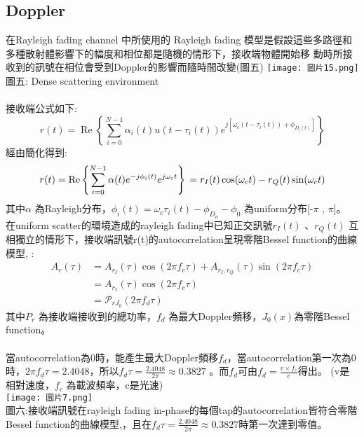 \documentclass[12pt,a4paper]{article} %
\begin{document}
\subsection{Doppler}
在Rayleigh fading channel 中所使用的 Rayleigh fading 模型是假設這些多路徑和
多種散射體影響下的幅度和相位都是隨機的情形下，接收端物體開始移
動時所接收到的訊號在相位會受到Doppler的影響而隨時間改變(圖五)
\texttt{[image: 圖片15.png]}\\
圖五: Dense scattering environment \cite{goldsmith2005wireless}\\
\\
接收端公式如下:
\[r(t)=\operatorname{Re}\left\{ \sum_{i=0}^{N-1} \alpha_i(t) u(t-\tau_i(t)) e^{j[\omega_c(t-\tau_i(t))+\phi_{D_i(t)}]}\right\}\]
經由簡化得到:
\[r(t) = \operatorname{Re}\left\{ \sum_{i=0}^{N-1} \alpha(t) e^{-j\phi_i(t)} e^{j\omega_c t} \right\} \\
= r_I(t) \cos(\omega_c t) - r_Q(t) \sin(\omega_c t)\]
其中$\alpha$ 為Rayleigh分布，$\phi_i(t) = \omega_c \tau_i(t) - \phi_{D_n} - \phi_0$ 為uniform分布[-$\pi$ , $\pi$]。
\\
在uniform scatter的環境造成的rayleigh fading中已知正交訊號$r_I(t)$
、$r_Q(t)$ 互相獨立的情形下，接收端訊號r(t)的autocorrelation呈現零階Bessel function的曲線模型\cite{goldsmith2005wireless},\cite{zheng2002improved} : 
\begin{align*}
A_r(\tau) &= A_{r_I}(\tau) \cos(2\pi f_c \tau) + A_{r_I,r_Q}(\tau) \sin(2\pi f_c \tau) \\
&= A_{r_I}(\tau) \cos(2\pi f_c \tau) \\
&= \mathcal{P}_{rJ_0}(2\pi f_d \tau)
\end{align*}
其中$P_{r}$ 為接收端接收到的總功率，$f_{d}$ 為最大Doppler頻移，$J_{0}(x)$為零階Bessel function。\\
\\
當autocorrelation為0時，能產生最大Doppler頻移$f_{d}$，當autocorrelation第一次為0時，$2\pi f_d \tau = 2.4048$，所以$f_d \tau = \frac{2.4048}{2\pi} \approx 0.3827$
。而$f_{d}$可由$f_d = \frac{v \times f_c}{c}$得出。
  (v是相對速度，$f_{c}$ 為載波頻率，c是光速)\\
\texttt{[image: 圖片7.png]}\\
圖六:接收端訊號在rayleigh fading in-phase的每個tap的autocorrelation皆符合零階Bessel function的曲線模型\cite{goldsmith2005wireless},\cite{zheng2002improved}，且在$f_d \tau = \frac{2.4048}{2\pi} \approx 0.3827$時第一次達到零值。
\end{document}
